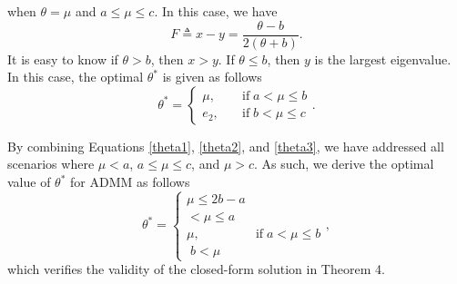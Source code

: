\documentclass[letterpaper]{article} %
\begin{document}
 when $\theta=\mu$ and $a\leq \mu \leq c$. In this case, we have
\begin{equation*}
F \triangleq x-y =\frac{\theta-b}{2(\theta+b)}.
\end{equation*}
It is easy to know if $\theta>b$, then $x > y$. If $\theta\leq b$, then $y$ is the largest eigenvalue. In this case, the optimal $\theta^*$ is given as follows
 \begin{equation}\label{theta3}
	\theta^*=
	\begin{cases}
		\mu,\quad & \text{if}\;a< \mu \leq b \\
            e_2,\quad & \text{if}\;b< \mu \leq c
	\end{cases}.
\end{equation}

By combining Equations \eqref{theta1}, \eqref{theta2}, and \eqref{theta3}, we have addressed all scenarios where $\mu<a$, $a\leq \mu \leq c$, and $\mu>c$. As such, we derive the optimal value
of $\theta^*$ for ADMM as follows
\begin{equation*}
	\theta^*=
	\begin{cases}
 \mu \leq 2b- a\\
 <\mu \leq a \\
		\mu,\quad & \text{if}\; a < \mu \leq b\\
 \;b<\mu
	\end{cases},
\end{equation*}
which verifies the validity of the closed-form solution in Theorem 4.


\clearpage

\end{document}
